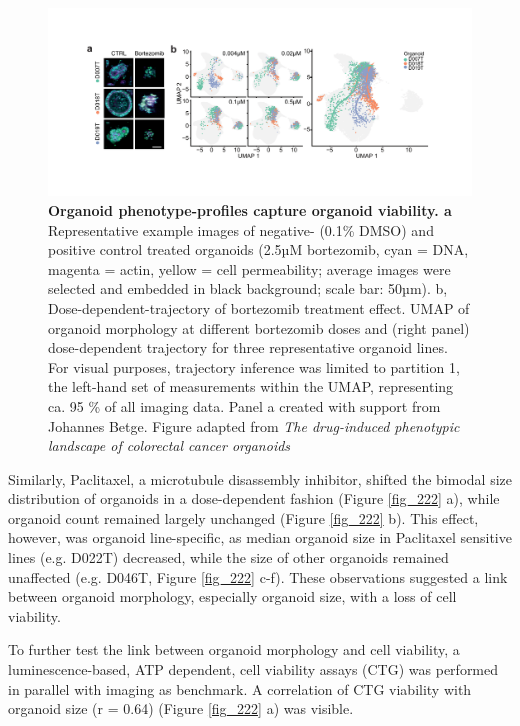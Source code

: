 \begin{flushleft}
\begin{figure}[h]
\centering
\includegraphics[width=\textwidth,
                height=\textheight,
                keepaspectratio]{figures/promise/pdf/fig_2_1.pdf}
\caption[Organoid phenotype-profiles capture organoid viability]{\textbf{Organoid phenotype-profiles capture organoid viability. a} Representative example images of negative- (0.1\% DMSO) and positive control treated organoids (2.5µM bortezomib, cyan = DNA, magenta = actin, yellow = cell permeability; average images were selected and embedded in black background; scale bar: 50µm). b, Dose-dependent-trajectory of bortezomib treatment effect. UMAP of organoid morphology at different bortezomib doses and (right panel) dose-dependent trajectory for three representative organoid lines. For visual purposes, trajectory inference was limited to partition 1, the left-hand set of measurements within the UMAP, representing ca. 95 \% of all imaging data. Panel a created with support from Johannes Betge. Figure adapted from \textit{The drug-induced phenotypic landscape of colorectal cancer organoids} \citep{Betge2022-kr}}
\label{fig_221}
\end{figure}
\bigbreak

Similarly, Paclitaxel, a microtubule disassembly inhibitor, shifted the bimodal size distribution of organoids in a dose-dependent fashion (Figure \ref{fig_222} a), while organoid count remained largely unchanged (Figure \ref{fig_222} b). This effect, however, was organoid line-specific, as median organoid size in Paclitaxel sensitive lines (e.g. D022T) decreased, while the size of other organoids remained unaffected (e.g. D046T, Figure \ref{fig_222} c-f). These observations suggested a link between organoid morphology, especially organoid size, with a loss of cell viability. 

\bigbreak
To further test the link between organoid morphology and cell viability, a luminescence-based, ATP dependent, cell viability assays (CTG) was performed in parallel with imaging as benchmark. A correlation of CTG viability with organoid size (r = 0.64) (Figure \ref{fig_222} a) was visible. 


\end{flushleft}
